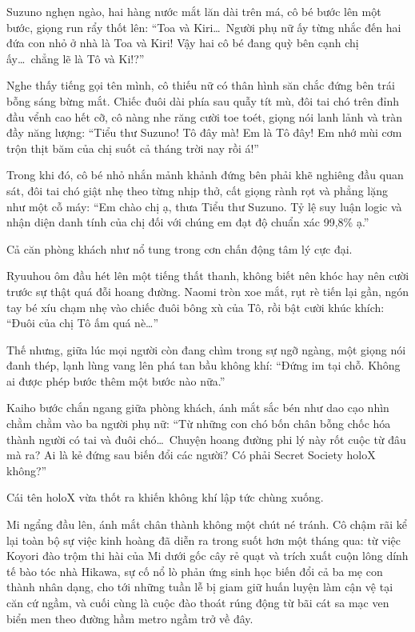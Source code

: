 \documentclass[../main.tex]{subfiles}
\begin{document}
Suzuno nghẹn ngào, hai hàng nước mắt lăn dài trên má, cô bé bước lên một bước, giọng run rẩy thốt lên: ``Toa và Kiri\dots\ Người phụ nữ ấy từng nhắc đến hai đứa con nhỏ ở nhà là Toa và Kiri! Vậy hai cô bé đang quỳ bên cạnh chị ấy\dots\ chẳng lẽ là Tô và Ki!?''

Nghe thấy tiếng gọi tên mình, cô thiếu nữ có thân hình săn chắc đứng bên trái bỗng sáng bừng mắt. Chiếc đuôi dài phía sau quẫy tít mù, đôi tai chó trên đỉnh đầu vểnh cao hết cỡ, cô nàng nhe răng cười toe toét, giọng nói lanh lảnh và tràn đầy năng lượng: ``Tiểu thư Suzuno! Tô đây mà! Em là Tô đây! Em nhớ mùi cơm trộn thịt băm của chị suốt cả tháng trời nay rồi á!''

Trong khi đó, cô bé nhỏ nhắn mảnh khảnh đứng bên phải khẽ nghiêng đầu quan sát, đôi tai chó giật nhẹ theo từng nhịp thở, cất giọng rành rọt và phẳng lặng như một cỗ máy: ``Em chào chị ạ, thưa Tiểu thư Suzuno. Tỷ lệ suy luận logic và nhận diện danh tính của chị đối với chúng em đạt độ chuẩn xác 99,8\% ạ.''

Cả căn phòng khách như nổ tung trong cơn chấn động tâm lý cực đại.

Ryuuhou ôm đầu hét lên một tiếng thất thanh, không biết nên khóc hay nên cười trước sự thật quá đỗi hoang đường. Naomi tròn xoe mắt, rụt rè tiến lại gần, ngón tay bé xíu chạm nhẹ vào chiếc đuôi bông xù của Tô, rồi bật cười khúc khích: ``Đuôi của chị Tô ấm quá nè\dots''

Thế nhưng, giữa lúc mọi người còn đang chìm trong sự ngỡ ngàng, một giọng nói đanh thép, lạnh lùng vang lên phá tan bầu không khí: ``Đứng im tại chỗ. Không ai được phép bước thêm một bước nào nữa.''

Kaiho bước chắn ngang giữa phòng khách, ánh mắt sắc bén như dao cạo nhìn chằm chằm vào ba người phụ nữ: ``Từ những con chó bốn chân bỗng chốc hóa thành người có tai và đuôi chó\dots\ Chuyện hoang đường phi lý này rốt cuộc từ đâu mà ra? Ai là kẻ đứng sau biến đổi các người? Có phải Secret Society holoX không?''

Cái tên holoX vừa thốt ra khiến không khí lập tức chùng xuống.

Mi ngẩng đầu lên, ánh mắt chân thành không một chút né tránh. Cô chậm rãi kể lại toàn bộ sự việc kinh hoàng đã diễn ra trong suốt hơn một tháng qua: từ việc Koyori đào trộm thi hài của Mi dưới gốc cây rẻ quạt và trích xuất cuộn lông dính tế bào tóc nhà Hikawa, sự cố nổ lò phản ứng sinh học biến đổi cả ba mẹ con thành nhân dạng, cho tới những tuần lễ bị giam giữ huấn luyện làm cận vệ tại căn cứ ngầm, và cuối cùng là cuộc đào thoát rúng động từ bãi cát sa mạc ven biển men theo đường hầm metro ngầm trở về đây.
\end{document}
